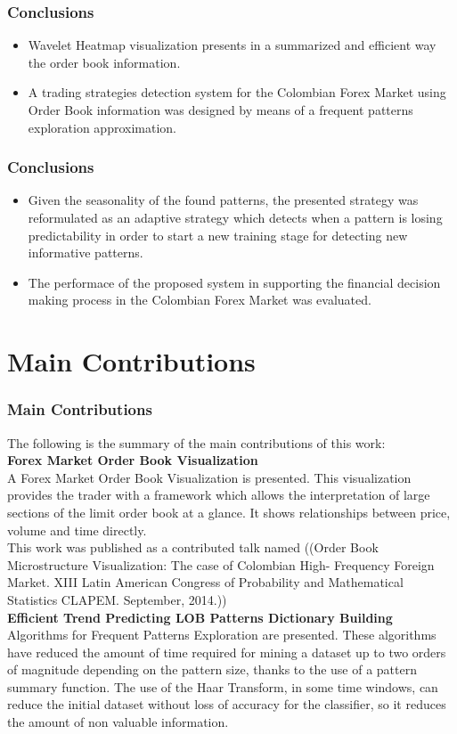 \documentclass{beamer}
\begin{document}
\begin{frame}
\frametitle{Conclusions}
\begin{itemize}
	\item Wavelet Heatmap visualization presents in a summarized and efficient way the order book information.
	\item A trading strategies detection system for the Colombian Forex Market using Order Book information was designed by means of a frequent patterns exploration approximation.
\end{itemize}

\end{frame}

\begin{frame}
\frametitle{Conclusions}
\begin{itemize}
	\item Given the seasonality of the found patterns, the presented strategy was reformulated as an adaptive strategy which detects when a pattern is losing predictability in order to start a new training stage for detecting new informative patterns.
	\item The performace of the proposed system in supporting the financial decision making process in the Colombian Forex Market was evaluated.
\end{itemize}

\end{frame}

\section{Main Contributions}

\begin{frame}
\frametitle{Main Contributions}
\small The following is the summary of the main contributions of this work:\\
\textbf{Forex Market Order Book Visualization}\\
A Forex Market Order Book Visualization is presented. This visualization provides the trader with a framework which allows the interpretation of large sections of the limit order book at a glance. It shows relationships between price, volume and time directly.\\
This work was published as a contributed talk named ((Order Book Microstructure Visualization: The case of Colombian High- Frequency Foreign Market. XIII Latin American Congress of Probability and Mathematical Statistics CLAPEM. September, 2014.))\\
\textbf{Efficient Trend Predicting LOB Patterns Dictionary Building}\\ 
Algorithms for Frequent Patterns Exploration are presented. These algorithms have reduced the amount of time required for mining a dataset up to two orders of magnitude depending on the pattern size, thanks to the use of a pattern summary function. The use of the Haar Transform, in some time windows, can reduce the initial dataset without loss of accuracy for the classifier, so it reduces the amount of non valuable information.
\end{frame}
\end{document}
